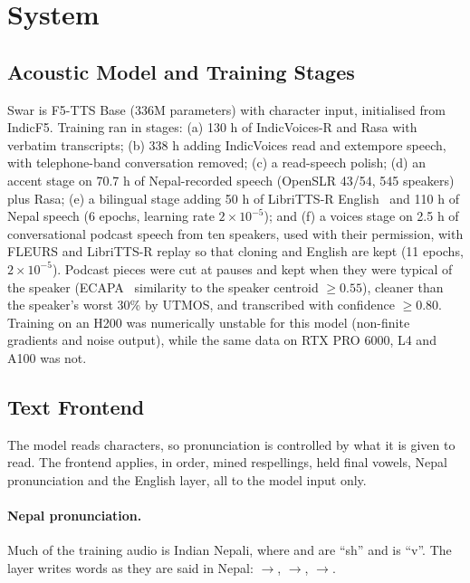 \section{System}\label{sec:system}

\subsection{Acoustic Model and Training Stages}
Swar is F5-TTS Base (336M parameters) with character input, initialised from IndicF5. Training ran in stages: (a) 130 h of IndicVoices-R and Rasa with verbatim transcripts; (b) 338 h adding IndicVoices read and extempore speech, with telephone-band conversation removed; (c) a read-speech polish; (d) an accent stage on 70.7 h of Nepal-recorded speech (OpenSLR 43/54, 545 speakers) plus Rasa; (e) a bilingual stage adding 50 h of LibriTTS-R English~\citep{librittsr} and 110 h of Nepal speech (6 epochs, learning rate $2\times10^{-5}$); and (f) a voices stage on 2.5 h of conversational podcast speech from ten speakers, used with their permission, with FLEURS and LibriTTS-R replay so that cloning and English are kept (11 epochs, $2\times10^{-5}$). Podcast pieces were cut at pauses and kept when they were typical of the speaker (ECAPA~\citep{ecapa} similarity to the speaker centroid $\geq 0.55$), cleaner than the speaker's worst 30\% by UTMOS, and transcribed with confidence $\geq 0.80$. Training on an H200 was numerically unstable for this model (non-finite gradients and noise output), while the same data on RTX PRO 6000, L4 and A100 was not.

\subsection{Text Frontend}\label{sec:frontend}
The model reads characters, so pronunciation is controlled by what it is given to read. The frontend applies, in order, mined respellings, held final vowels, Nepal pronunciation and the English layer, all to the model input only.

\paragraph{Nepal pronunciation.} Much of the training audio is Indian Nepali, where  and  are ``sh'' and  is ``v''. The layer writes words as they are said in Nepal: $\to$, $\to$, $\to$.

